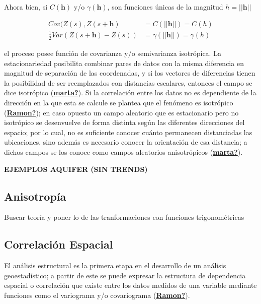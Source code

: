\documentclass[
]{book}
\begin{document}
Ahora bien, si \(C(\textbf{h})\) y/o \(\gamma(\textbf{h})\), son funciones únicas de la magnitud \(h=||\textbf{h}||\)

\begin{align}
    Cov(Z(s),Z(s+\textbf{h})&= C(||\textbf{h}||)= C(h)\\
    \frac{1}{2} Var(Z(s+\textbf{h})-Z(s))&=\gamma(||\textbf{h}||)=\gamma(h)
\end{align}

el proceso posee función de covarianza y/o semivarianza isotrópica. La estacionariedad posibilita combinar pares de datos con la misma diferencia en magnitud de separación de las coordenadas, y si los vectores de diferencias tienen la posibilidad de ser reemplazados con distancias escalares, entonces el campo se dice isotrópico (\protect\hyperlink{ref-marta}{\textbf{marta?}}). Si la correlación entre los datos no es dependiente de la dirección en la que esta se calcule se plantea que el fenómeno es isotrópico (\protect\hyperlink{ref-Ramon}{\textbf{Ramon?}}); en caso opuesto un campo aleatorio que es estacionario pero no isotrópico se desenvuelve de forma distinta según las diferentes direcciones del espacio; por lo cual, no es suficiente conocer cuánto permanecen distanciadas las ubicaciones, sino además es necesario conocer la orientación de esa distancia; a dichos campos se los conoce como campos aleatorios anisotrópicos (\protect\hyperlink{ref-marta}{\textbf{marta?}}).

\textbf{EJEMPLOS AQUIFER (SIN TRENDS)}

\hypertarget{anisotropuxeda}{%
\subsection{Anisotropía}\label{anisotropuxeda}}

Buscar teoría y poner lo de las tranformaciones con funciones trigonométricas

\hypertarget{correlaciuxf3n-espacial}{%
\subsection{Correlación Espacial}\label{correlaciuxf3n-espacial}}

El análisis estructural es la primera etapa en el desarrollo de un análisis geoestadístico; a partir de este se puede expresar la estructura de dependencia espacial o correlación que existe entre los datos medidos de una variable mediante funciones como el variograma y/o covariograma (\protect\hyperlink{ref-Ramon}{\textbf{Ramon?}}).
\end{document}
